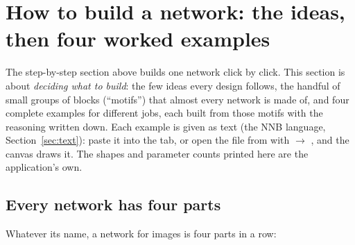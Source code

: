 \section{How to build a network: the ideas, then four worked examples}
\label{sec:build}

The step-by-step section above builds one network click by click. This section is about \emph{deciding what to build}: the few ideas
every design follows, the handful of small groups of blocks (``motifs'') that almost every network is made of, and four complete
examples for different jobs, each built from those motifs with the reasoning written down. Each example is given as text (the NNB
language, Section~\ref{sec:text}): paste it into the  tab, or open the file from  with 
$\rightarrow$ , and the canvas draws it. The shapes and parameter counts printed here are the application's own.

\subsection{Every network has four parts}
\label{sec:build-parts}
Whatever its name, a network for images is four parts in a row:

